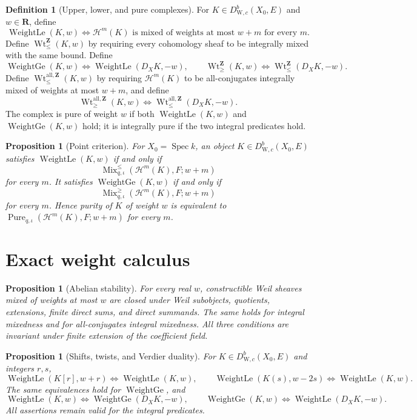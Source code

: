 \documentclass[10pt]{article}
\newtheorem{proposition}[theorem]{Proposition}
\theoremstyle{definition}
\newtheorem{definition}[theorem]{Definition}
\newcommand{\WeilD}{D^b_{\mathrm W,c}}
\newcommand{\WtLe}{\operatorname{WeightLe}}
\newcommand{\WtGe}{\operatorname{WeightGe}}
\newcommand{\IntWtLe}{\operatorname{Wt}^{\mathbf Z}_{\leq}}
\newcommand{\IntWtGe}{\operatorname{Wt}^{\mathbf Z}_{\geq}}
\newcommand{\MixLe}{\operatorname{Mix}^{\leq}}
\newcommand{\MixGe}{\operatorname{Mix}^{\geq}}
\newcommand{\Pure}{\operatorname{Pure}}
\newcommand{\Spec}{\operatorname{Spec}}
\newcommand{\AllIntWtLe}{\operatorname{Wt}^{\mathrm{all},\mathbf Z}_{\leq}}
\newcommand{\AllIntWtGe}{\operatorname{Wt}^{\mathrm{all},\mathbf Z}_{\geq}}
\begin{document}
\begin{definition}[Upper, lower, and pure complexes]
For \(K\in\WeilD(X_0,E)\) and \(w\in\mathbf R\), define
\[
 \WtLe(K,w)\Longleftrightarrow
 \mathcal H^m(K)\text{ is mixed of weights at most }w+m
 \text{ for every }m.
\]
Define \(\IntWtLe(K,w)\) by requiring every cohomology sheaf to be
integrally mixed with the same bound.  Define
\[
 \WtGe(K,w)\Longleftrightarrow\WtLe(D_XK,-w),
 \qquad
 \IntWtGe(K,w)\Longleftrightarrow\IntWtLe(D_XK,-w).
\]
Define \(\AllIntWtLe(K,w)\) by requiring \(\mathcal H^m(K)\) to be
all-conjugates integrally mixed of weights at most \(w+m\), and define
\[
 \AllIntWtGe(K,w)\Longleftrightarrow\AllIntWtLe(D_XK,-w).
\]
The complex is pure of weight \(w\) if both \(\WtLe(K,w)\) and
\(\WtGe(K,w)\) hold; it is integrally pure if the two integral predicates
hold.
\end{definition}

\begin{proposition}[Point criterion]
For \(X_0=\Spec k\), an object \(K\in\WeilD(X_0,E)\) satisfies
\(\WtLe(K,w)\) if and only if
\[
 \MixLe_{q,\iota}(\mathcal H^m(K),F;w+m)
\]
for every \(m\).  It satisfies \(\WtGe(K,w)\) if and only if
\[
 \MixGe_{q,\iota}(\mathcal H^m(K),F;w+m)
\]
for every \(m\).  Hence purity of \(K\) of weight \(w\) is equivalent to
\(\Pure_{q,\iota}(\mathcal H^m(K),F;w+m)\) for every \(m\).
\end{proposition}

\section{Exact weight calculus}

\begin{proposition}[Abelian stability]
For every real \(w\), constructible Weil sheaves mixed of weights at most
\(w\) are closed under Weil subobjects, quotients, extensions, finite direct
sums, and direct summands.  The same holds for integral mixedness and for
all-conjugates integral mixedness.  All three conditions are invariant under
finite extension of the coefficient field.
\end{proposition}

\begin{proposition}[Shifts, twists, and Verdier duality]
For \(K\in\WeilD(X_0,E)\) and integers \(r,s\),
\[
 \WtLe(K[r],w+r)\Longleftrightarrow\WtLe(K,w),
 \qquad
 \WtLe(K(s),w-2s)\Longleftrightarrow\WtLe(K,w).
\]
The same equivalences hold for \(\WtGe\), and
\[
 \WtLe(K,w)\Longleftrightarrow\WtGe(D_XK,-w),
 \qquad
 \WtGe(K,w)\Longleftrightarrow\WtLe(D_XK,-w).
\]
All assertions remain valid for the integral predicates.
\end{proposition}
\end{document}
